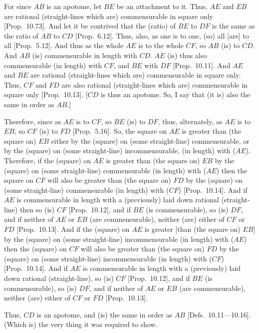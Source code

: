\begin{Parallel}{}{}
{\epsfysize=0.7in
\centerline{}

For since $AB$ is an apotome, let $BE$ be an attachment to it. Thus,
$AE$ and $EB$ are rational (straight-lines which are) commensurable in
square only [Prop.~10.73]. And let it 
be contrived that the (ratio)
of $BE$ to $DF$ is the same as the ratio of $AB$ to $CD$
[Prop.~6.12]. Thus, also, as one is to one, (so)
all [are] to all [Prop.~5.12]. And thus as the whole $AE$ is to the whole $CF$, so $AB$
(is) to $CD$. And $AB$ (is) commensurable in length with $CD$.
$AE$ (is) thus also commensurable (in length) with $CF$, and $BE$
with $DF$ [Prop.~10.11]. And $AE$ and $BE$
are rational (straight-lines which are) commensurable in square only.
Thus, $CF$ and $FD$ are also rational (straight-lines which are) commensurable in square only [Prop.~10.13].
[$CD$ is thus an apotome. So, I say that (it is) also the same in order as $AB$.]

Therefore, since as $AE$ is to $CF$, so $BE$ (is) to $DF$, thus, alternately,
as $AE$ is to $EB$, so $CF$ (is) to $FD$ [Prop.~5.16]. So,  the square on $AE$
is greater than (the square on) $EB$ either by the (square) on (some straight-line)
commensurable,  or by the (square) on (some straight-line)
incommensurable, (in length) with ($AE$). Therefore, if the
(square) on $AE$ is greater than (the square on) $EB$ by the (square)
on (some straight-line) commensurable (in length) with ($AE$) then the
square on $CF$ will also be greater than (the square on) $FD$ by the (square)
on (some straight-line) commensurable (in length) with ($CF$)
[Prop.~10.14]. And if $AE$ is commensurable
in length with a (previously) laid down rational (straight-line) then so (is)
$CF$ [Prop.~10.12], and if $BE$ (is commensurable), so (is) $DF$, and if neither of
$AE$ or $EB$ (are commensurable), neither  (are) either of $CF$ or $FD$
[Prop.~10.13]. And if the (square) on
$AE$ is greater [than (the square on) $EB$] by the (square) on
(some straight-line) incommensurable (in length) with ($AE$) then the
(square) on $CF$ will also be greater than (the square on) $FD$ by the (square)
on (some straight-line) incommensurable (in length) with ($CF$)
[Prop.~10.14].  And if $AE$ is commensurable
in length with a (previously) laid down rational (straight-line), so (is)
$CF$ [Prop.~10.12], and if $BE$ (is commensurable), so (is) $DF$, and if neither of
$AE$ or $EB$ (are commensurable),  neither (are)  either of $CF$ or $FD$
[Prop.~10.13].

Thus, $CD$ is an apotome, and (is) the same in order as $AB$ [Defs.~10.11---10.16].
(Which is) the very thing it was required to show.}
\end{Parallel}

